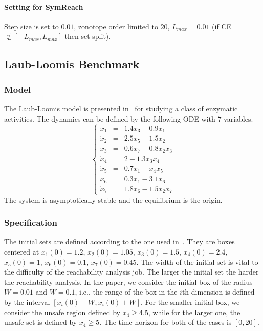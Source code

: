 \documentclass[EPiC]{easychair}
\begin{document}
\paragraph{Setting for SymReach}
Step size is set to $0.01$, zonotope order limited to $20$, $L_{max} = 0.01$ (if CE $ \not\subset [-L_{max},L_{max}]$ then set split).


\subsection{Laub-Loomis Benchmark}

\subsubsection{Model}

The Laub-Loomis model is presented in~\cite{Laub+Loomis/1998/oscillator} for studying a class of enzymatic activities. The dynamics can be defined by the following ODE with $7$ variables.
\[
\left\{
\begin{array}{lcl}
 \dot{x}_1 & = & 1.4 x_3 - 0.9 x_1 \\
 \dot{x}_2 & = & 2.5 x_5 - 1.5 x_2 \\
 \dot{x}_3 & = & 0.6 x_7 - 0.8 x_2 x_3 \\
 \dot{x}_4 & = & 2 - 1.3 x_3 x_4 \\
 \dot{x}_5 & = & 0.7 x_1 - x_4 x_5 \\
 \dot{x}_6 & = & 0.3 x_1 - 3.1 x_6 \\
 \dot{x}_7 & = & 1.8 x_6 - 1.5 x_2 x_7
\end{array}
\right.
\]
The system is asymptotically stable and the equilibrium is the origin.


\subsubsection{Specification}

The initial sets are defined according to the one used in~\cite{Testylier+/2013/NLTOOLBOX}. They are boxes centered at $x_1(0) = 1.2$, $x_2(0) = 1.05$, $x_3(0) =
1.5$, $x_4(0) = 2.4$, $x_5(0) = 1$, $x_6(0) = 0.1$, $x_7(0) = 0.45$. The width of the initial set is vital to the difficulty of the reachability analysis job. The larger the initial set the harder the reachability analysis. In the paper, we consider the initial box of the radius $W = 0.01$ and $W = 0.1$, i.e., the range of the box in the $i$th dimension is defined by the interval $[x_i(0)-W, x_i(0)+W]$. For the smaller initial box, we consider the unsafe region defined by $x_4 \geq 4.5$, while for the larger one, the unsafe set is defined by $x_4 \geq 5$. The time horizon for both of the cases is $[0,20]$.
\end{document}
